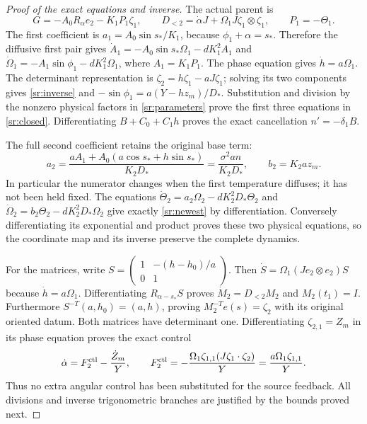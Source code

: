 \begin{proof}[Proof of the exact equations and inverse]
The actual parent is
\[
 G=-A_0R_\alpha e_2-K_1P_1\zeta_1,
 \qquad D_{<2}=\dot\alpha J+
       \Omega_1J\zeta_1\otimes\zeta_1,
 \qquad P_1=-\Theta_1.
\]
The first coefficient is $a_1=A_0\sin s_*/K_1$, because
$\phi_1+\alpha=s_*$. Therefore the diffusive first pair gives
$\dot A_1=-A_0\sin s_*\Omega_1-dK_1^2 A_1$ and
$\dot\Omega_1=-A_1\sin\phi_1-dK_1^2\Omega_1$, where
$A_1=K_1P_1$. The phase equation gives $\dot h=a\Omega_1$.
The determinant representation is $\zeta_2=h\zeta_1-aJ\zeta_1$;
solving its two components gives \eqref{sr:inverse} and
$-\sin\phi_1=a(Y-hz_m)/D_*$. Substitution and division by the
nonzero physical factors in \eqref{sr:parameters} prove the first
three equations in \eqref{sr:closed}. Differentiating
$B+C_0+C_1h$ proves the exact cancellation $n'=-\delta_1B$.

The full second coefficient retains the original base term:
\[
 a_2=\frac{aA_1+A_0(a\cos s_*+h\sin s_*)}{K_2D_*}
     =\frac{\sigma^2 a n}{K_2D_*},\qquad b_2=K_2az_m.
\]
In particular the numerator changes when the first temperature
diffuses; it has not been held fixed. The equations
$\dot\Theta_2=a_2\Omega_2-dK_2^2D_*\Theta_2$ and
$\dot\Omega_2=b_2\Theta_2-dK_2^2D_*\Omega_2$ give exactly
\eqref{sr:newest} by differentiation. Conversely differentiating its
exponential and product proves these two physical equations, so the
coordinate map and its inverse preserve the complete dynamics.

For the matrices, write $S=\left(\begin{smallmatrix}1&-(h-h_0)/a\\0&1\end{smallmatrix}\right)$.
Then $\dot S=\Omega_1(Je_2\otimes e_2)S$ because
$\dot h=a\Omega_1$. Differentiating $R_{\alpha-s_*}S$ proves
$\dot M_2=D_{<2}M_2$ and $M_2(t_1)=I$.
Furthermore $S^{-T}(a,h_0)=(a,h)$, proving
$M_2^{-T}e(s)=\zeta_2$ with its original oriented datum.
Both matrices have determinant one. Differentiating
$\zeta_{2,1}=Z_m$ in its phase equation proves the exact control
\[
 \dot\alpha=F_2^{\rm ctl}-\frac{\dot Z_m}{Y},\qquad
 F_2^{\rm ctl}=-\frac{\Omega_1\zeta_{1,1}
                       (J\zeta_1\cdot\zeta_2)}{Y}
                  =\frac{a\Omega_1\zeta_{1,1}}{Y}.
\]
Thus no extra angular control has been substituted for the source
feedback. All divisions and inverse trigonometric branches are
justified by the bounds proved next.
\end{proof}


